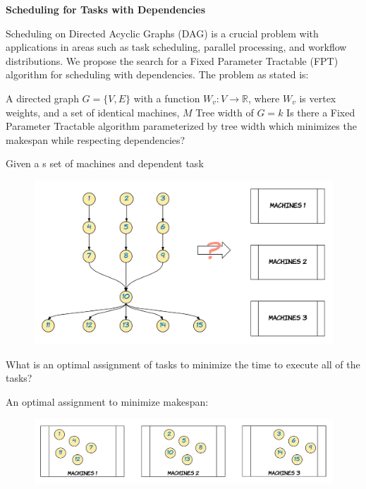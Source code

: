 \Large {\bf Scheduling for Tasks with Dependencies}

\large Scheduling on Directed Acyclic Graphs (DAG) is a crucial problem with
applications in areas such as task scheduling, parallel processing, and
workflow distributions. We propose the search for a Fixed Parameter Tractable
(FPT) algorithm for scheduling with dependencies. The problem as stated is:

%
{A directed graph $G = \{V, E\}$ with a function $W_v: V \to \mathbb{R}$,
 where $W_v$ is vertex weights, and a set of identical machines,
$M$}%
{Tree width of $G = k$}%
{Is there a Fixed Parameter Tractable algorithm parameterized by tree width
which  minimizes the makespan while respecting
dependencies?}%

\large Given a s set of machines and dependent task

\begin{figure}[h]
	\includegraphics*[width=\linewidth]{images/Fig1.png}
\end{figure}

What is an optimal assignment of tasks to minimize the time to execute all of
the tasks?

An optimal assignment to minimize makespan:

\begin{figure}[h]
	\includegraphics*[width=\linewidth]{images/Fig2.png}
\end{figure}
